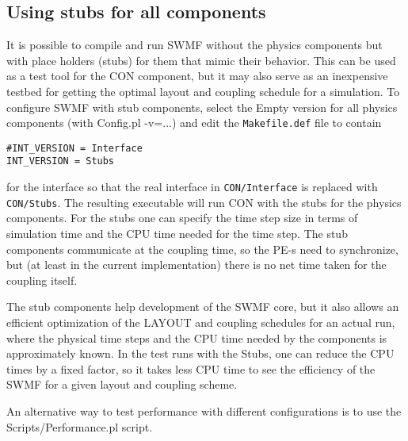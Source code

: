 \subsection{Using stubs for all components}

It is possible to compile and run SWMF without the physics components
but with place holders (stubs) for them that mimic their behavior.
This can be used as a test tool for the CON component, but it may
also serve as an inexpensive testbed for getting the optimal layout
and coupling schedule for a simulation. To configure SWMF with 
stub components, select the Empty version for all physics components
(with Config.pl -v=...) and edit the {\tt Makefile.def} file to
contain
\begin{verbatim}
#INT_VERSION = Interface
INT_VERSION = Stubs
\end{verbatim}
for the interface so that the real interface in {\tt CON/Interface}
is replaced with {\tt CON/Stubs}.
The resulting executable will run CON with 
the stubs for the physics components. For the stubs one can
specify the time step size in terms of simulation time and the
CPU time needed for the time step. The stub components communicate
at the coupling time, so the PE-s need to synchronize, but 
(at least in the current implementation) there is no net time taken
for the coupling itself. 

The stub components help development of the SWMF core, but it also
allows an efficient optimization of the LAYOUT and coupling
schedules for an actual run, where the physical time steps
and the CPU time needed by the components is approximately known.
In the test runs with the Stubs, one can reduce the CPU times by 
a fixed factor, so it takes less CPU time to see the efficiency of the 
SWMF for a given layout and coupling scheme.

An alternative way to test performance with different configurations is
to use the Scripts/Performance.pl script.
